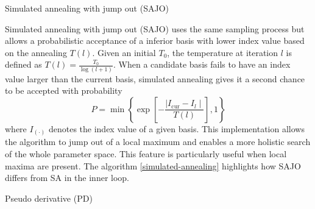 \begin{algorithm}
\SetAlgoLined
{}
  \caption{Simulated annealing with jump out (SAJO)}
  \label{simulated-annealing}
\end{algorithm}

Simulated annealing with jump out (SAJO)
\citep{kirkpatrick1983optimization, bertsimas1993simulated} uses the
same sampling process but allows a probabilistic acceptance of a
inferior basis with lower index value based on the annealing \(T(l)\).
Given an initial \(T_0\), the temperature at iteration \(l\) is defined
as \(T(l) = \frac{T_0}{\log(l + 1)}\). When a candidate basis fails to
have an index value larger than the current basis, simulated annealing
gives it a second chance to be accepted with probability
\[P= \min\left\{\exp\left[-\frac{\mid I_{\text{cur}} - I_{l} \mid}{T(l)}\right],1\right\}\]
where \(I_{(\cdot)}\) denotes the index value of a given basis. This
implementation allows the algorithm to jump out of a local maximum and
enables a more holistic search of the whole parameter space. This
feature is particularly useful when local maxima are present. The
algorithm \ref{simulated-annealing} highlights how SAJO differs from SA
in the inner loop.

\begin{algorithm}
\SetAlgoLined
{}
\caption{Pseudo derivative (PD)}
\label{search-geodesic}
\end{algorithm}

